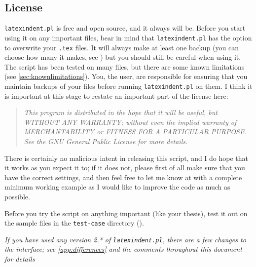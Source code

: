 \subsection{License}
	\texttt{latexindent.pl} is free and open source, and it always will be.
	Before you start using it on any important files, bear in mind that \texttt{latexindent.pl} has the option to overwrite your \texttt{.tex} files.
	It will always make at least one backup (you can choose how many it makes, see )
	but you should still be careful when using it. The script has been tested on many
	files, but there are some known limitations (see \cref{sec:knownlimitations}).
	You, the user, are responsible for ensuring that you maintain backups of your files
	before running \texttt{latexindent.pl} on them. I think it is important at this
	stage to restate an important part of the license here:
	\begin{quote}\itshape
		This program is distributed in the hope that it will be useful,
		but WITHOUT ANY WARRANTY; without even the implied warranty of
		MERCHANTABILITY or FITNESS FOR A PARTICULAR PURPOSE.  See the
		GNU General Public License for more details.
	\end{quote}
	There is certainly no malicious intent in releasing this script, and I do hope
	that it works as you expect it to; if it does not, please first of all
	make sure that you have the correct settings, and then feel free to let me know at \cite{latexindent-home} with a
	complete minimum working example as I would like to improve the code as much as possible.
	\begin{warning}
		Before you try the script on anything important (like your thesis), test it
		out on the sample files in the \texttt{test-case} directory (\cite{latexindent-home}).
	\end{warning}

	\emph{If you have used any version 2.* of \texttt{latexindent.pl}, there
		are a few changes to the interface; see \vref{app:differences} and the comments
		throughout this document for details}
